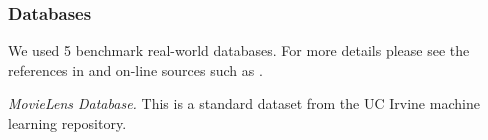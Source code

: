 \documentclass[twoside,leqno,twocolumn]{article}
\begin{document}
\subsubsection{Databases}

We used %
5 benchmark real-world databases.   
For more details please see the references in \cite{Schulte2012} and on-line sources such as \cite{bib:jbnsite}.



{\em MovieLens Database.} This is a standard dataset from the UC Irvine machine learning repository. 
%
\end{document}
